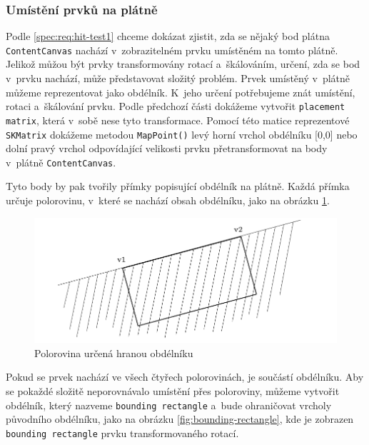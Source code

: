 \subsubsection*{Umístění prvků na plátně}
\label{kap3:element_hit_test}
Podle \ref{spec:req:hit-test1} chceme dokázat zjistit, zda se nějaký bod plátna \texttt{ContentCanvas} nachází v~zobrazitelném prvku umístěném na tomto plátně. Jelikož můžou být prvky transformovány rotací a~škálováním, určení, zda se bod v~prvku nachází, může představovat složitý problém. Prvek umístěný v~plátně můžeme reprezentovat jako obdélník. K~jeho určení potřebujeme znát umístění, rotaci a~škálování prvku. Podle předchozí části dokážeme vytvořit \texttt{placement} \texttt{matrix}, která v~sobě nese tyto transformace. Pomocí této matice reprezentové \texttt{SKMatrix} dokážeme metodou \texttt{MapPoint()} levý horní vrchol obdélníku [0,0] nebo dolní pravý vrchol odpovídající velikosti prvku přetransformovat na body v~plátně \texttt{ContentCanvas}.

Tyto body by pak tvořily přímky popisující obdélník na plátně. Každá přímka určuje polorovinu, v~které se nachází obsah obdélníku, jako na obrázku \ref{fig:hit-test-polorovina}.

\begin{figure}[!bht]
	\centering
	\includegraphics[width=\textwidth]{../img/kap3_rectangle_line_segment}
	\caption{Polorovina určená hranou obdélníku}
	\label{fig:hit-test-polorovina}
\end{figure}

Pokud se prvek nachází ve všech čtyřech polorovinách, je součástí obdélníku. Aby se pokaždé složitě neporovnávalo umístění přes poloroviny, můžeme vytvořit obdélník, který nazveme \texttt{bounding rectangle} a~bude ohraničovat vrcholy původního obdélníku, jako na obrázku \ref{fig:bounding-rectangle}, kde je zobrazen \texttt{bounding rectangle} prvku transformovaného rotací.

